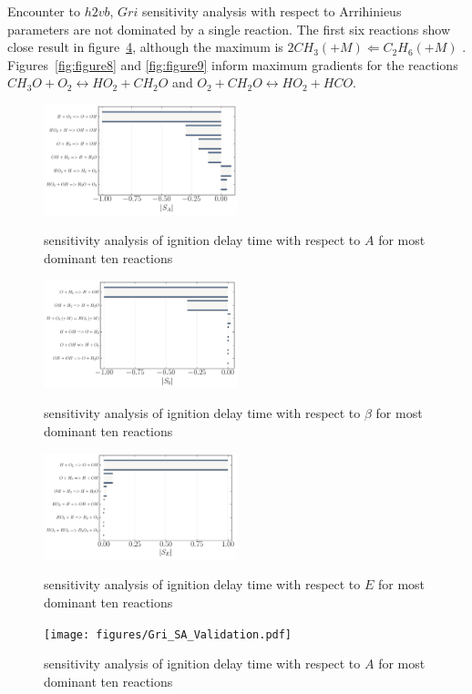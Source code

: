 \documentclass[preprint,review,12pt]{elsarticle}
\begin{document}
 Encounter to $h2vb$, $Gri$ sensitivity analysis with respect to Arrihinieus parameters are not dominated by a single reaction. The first six reactions show close result in figure~\ref{fig:figure7}, although the maximum is $2CH_3(+M)\Leftarrow C_2H_6(+M)$ . Figures~\ref{fig:figure8} and \ref{fig:figure9}  inform maximum gradients for the reactions $CH_3O+O_2 \leftrightarrow HO_2 +CH_2O$ and $O_2+CH_2O\leftrightarrow HO_2 +HCO$.
 

 
\begin{figure}
\centering
 {\includegraphics[width=0.5\textwidth]{figures/H2_SA_Validation.pdf}}
\caption{sensitivity analysis of ignition delay time with respect to $A$ for most dominant ten reactions}
    \label{fig:figure4}
\end{figure}

\begin{figure}
\centering
 {\includegraphics[width=0.5\textwidth]{figures/H2_Sb_Validation.pdf}}
\caption{sensitivity analysis of ignition delay time with respect to $\beta$ for most dominant ten reactions}
    \label{fig:figure5}
\end{figure}

\begin{figure}
\centering
 {\includegraphics[width=0.5\textwidth]{figures/H2_SE_Validation.pdf}}
\caption{sensitivity analysis of ignition delay time with respect to $E$ for most dominant ten reactions}
    \label{fig:figure6}
\end{figure}
\begin{figure}
\centering
 {\texttt{[image: figures/Gri\_SA\_Validation.pdf]}}
\caption{sensitivity analysis of ignition delay time with respect to $A$ for most dominant ten reactions}
    \label{fig:figure7}
\end{figure}
\end{document}
